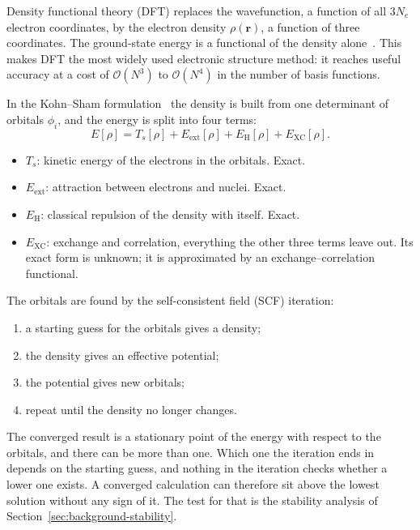 Density functional theory (DFT) replaces the wavefunction, a function of all
$3N_e$ electron coordinates, by the electron density $\rho(\mathbf{r})$, a
function of three coordinates. The ground-state energy is a functional of
the density alone~\cite{hohenberg1964}. This makes DFT the most widely used
electronic structure method: it reaches useful accuracy at a cost of
$\mathcal{O}(N^3)$ to $\mathcal{O}(N^4)$ in the number of basis functions.

In the Kohn--Sham formulation~\cite{kohn1965} the density is built from one
determinant of orbitals $\phi_i$, and the energy is split into four terms:
%
\begin{equation}
  E[\rho] = T_s[\rho] + E_\text{ext}[\rho] + E_\text{H}[\rho] + E_\text{XC}[\rho] .
  \label{eq:ks-energy}
\end{equation}

\begin{itemize}
  \item $T_s$: kinetic energy of the electrons in the orbitals. Exact.
  \item $E_\text{ext}$: attraction between electrons and nuclei. Exact.
  \item $E_\text{H}$: classical repulsion of the density with itself. Exact.
  \item $E_\text{XC}$: exchange and correlation, everything the other three
    terms leave out. Its exact form is unknown; it is approximated by an
    exchange--correlation functional.
\end{itemize}

The orbitals are found by the self-consistent field (SCF) iteration:

\begin{enumerate}
  \item a starting guess for the orbitals gives a density;
  \item the density gives an effective potential;
  \item the potential gives new orbitals;
  \item repeat until the density no longer changes.
\end{enumerate}

The converged result is a stationary point of the energy with respect
to the orbitals, and there can be more than one. Which one the
iteration ends in depends on the starting guess, and nothing in the
iteration checks whether a lower one exists. A converged calculation
can therefore sit above the lowest solution without any sign of it.
The test for that is the stability analysis of
Section~\ref{sec:background-stability}.

